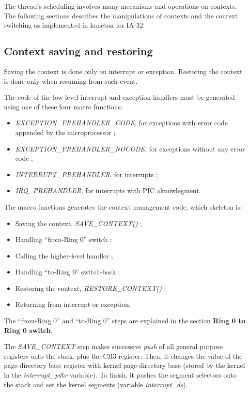 The thread's scheduling involves many mecanisms and operations on
contexts. The following sections describes the manipulations of
contexts and the context switching as implemented in kaneton for
IA-32.

%
%

\subsection{Context saving and restoring}

Saving the context is done only on interrupt or exception. Restoring
the context is done only when resuming from such event.

The code of the low-level interrupt and exception handlers must be
generated using one of these four macro functions:

\begin{itemize}
\item \textit{EXCEPTION\_PREHANDLER\_CODE}, for exceptions with error
code appended by the microprocessor ;
\item \textit{EXCEPTION\_PREHANDLER\_NOCODE}, for exceptions without
any error code ;
\item \textit{INTERRUPT\_PREHANDLER}, for interrupts ;
\item \textit{IRQ\_PREHANDLER}, for interrupts with PIC aknowlegment.
\end{itemize}

The macro functions generates the context management code, which
skeleton is:

\begin{itemize}
\item Saving the context, \textit{SAVE\_CONTEXT()} ;
\item Handling ``from-Ring 0'' switch ;
\item Calling the higher-level handler ;
\item Handling ``to-Ring 0'' switch-back ;
\item Restoring the context, \textit{RESTORE\_CONTEXT()} ;
\item Returning from interrupt or exception.
\end{itemize}

The ``from-Ring 0'' and ``to-Ring 0'' steps are explained in the
section \textbf{Ring 0 to Ring 0 switch}.

The \textit{SAVE\_CONTEXT} step makes successive \textit{push} of all
general purpose registers onto the stack, plus the CR3 register. Then,
it changes the value of the page-directory base register with kernel
page-directory base (stored by the kernel in the
\textit{interrupt\_pdbr} variable). To finish, it pushes the segment
selectors onto the stack and set the kernel segments (variable
\textit{interrupt\_ds}).

